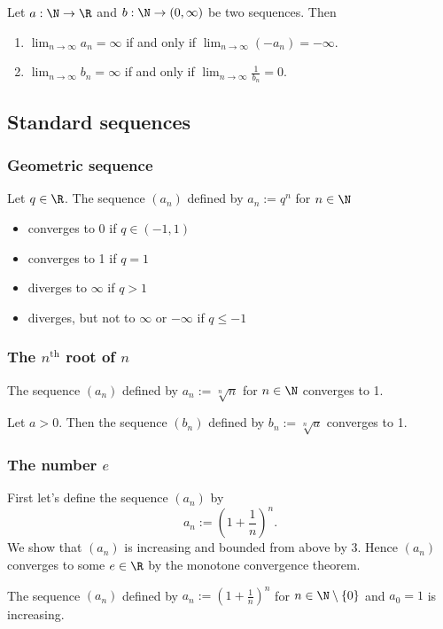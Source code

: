 \begin{proposition}
    Let $a: \N \to \R$ and $b: \N \to (0,\infty)$ be two sequences. Then
    \begin{enumerate}
        \item $\lim_{n\to\infty}a_n = \infty$ if and only if $\lim_{n\to\infty}(-a_n) = -\infty$.
        \item $\lim_{n\to\infty}b_n = \infty$ if and only if $\lim_{n\to\infty}\frac{1}{b_n} = 0$.
    \end{enumerate}
\end{proposition}

\subsection{Standard sequences}

\subsubsection{Geometric sequence}
\begin{proposition}
    Let $q \in \R$. The sequence $(a_n)$ defined by $a_n := q^n$ for $n \in \N$
    \begin{itemize}
        \item converges to 0 if $q \in (-1,1)$
        \item converges to 1 if $q = 1$
        \item diverges to $\infty$ if $q > 1$
        \item diverges, but not to $\infty$ or $-\infty$ if $q \le -1$
    \end{itemize}
\end{proposition}

\subsubsection{The $n^{\text{th}}$ root of $n$}
\begin{proposition}
    The sequence $(a_n)$ defined by $a_n := \sqrt[n]{n}$ for $n \in \N$ converges to 1.
\end{proposition}

\begin{corollary}
    Let $a > 0$. Then the sequence $(b_n)$ defined by $b_n := \sqrt[n]{a}$ converges to 1.
\end{corollary}

\subsubsection{The number $e$}
First let's define the sequence $(a_n)$ by
$$a_n := \left(1 + \frac{1}{n}\right)^n.$$
We show that $(a_n)$ is increasing and bounded from above by $3$. Hence $(a_n)$ converges to some $e \in \R$ by the monotone convergence theorem.
\begin{lemma}
    The sequence $(a_n)$ defined by $a_n := \left(1 + \frac{1}{n}\right)^n$ for $n \in \N \setminus \{0\}$ and $a_0 = 1$ is increasing.
\end{lemma}

